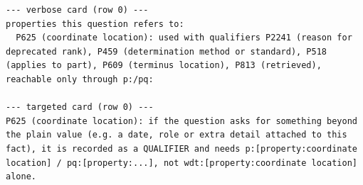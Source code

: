\begin{lstlisting}[caption={Example schema cards, one of each form, as supplied to the generator.},label={lst:schema-cards},basicstyle=\ttfamily\scriptsize,breaklines=true,captionpos=b]
--- verbose card (row 0) ---
properties this question refers to:
  P625 (coordinate location): used with qualifiers P2241 (reason for deprecated rank), P459 (determination method or standard), P518 (applies to part), P609 (terminus location), P813 (retrieved), reachable only through p:/pq:

--- targeted card (row 0) ---
P625 (coordinate location): if the question asks for something beyond the plain value (e.g. a date, role or extra detail attached to this fact), it is recorded as a QUALIFIER and needs p:[property:coordinate location] / pq:[property:...], not wdt:[property:coordinate location] alone.
\end{lstlisting}
